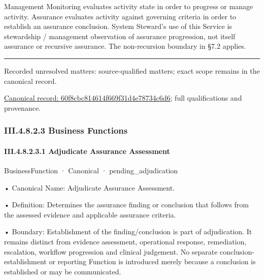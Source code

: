 Management Monitoring evaluates activity state in order to progress or manage activity. Assurance evaluates activity against governing criteria in order to establish an assurance conclusion. System Steward's use of this Service is stewardship / management observation of assurance progression, not itself assurance or recursive assurance. The non-recursion boundary in §7.2 applies.



\medskip\hrule\medskip

{\small Recorded unresolved matters: source-qualified matters; exact scope remains in the canonical record.}\par
{\footnotesize \href{../../../../../../../continuum/business/business-service/60f8cbc814614f669f31d4e78734c6d6.md}{Canonical record: 60f8cbc814614f669f31d4e78734c6d6}; full qualifications and provenance.}\par
\subsubsection*{III.4.8.2.3 Business Functions}
\label{navigation:III.4.8.2.3}

\paragraph*{III.4.8.2.3.1 Adjudicate Assurance Assessment}
\label{navigation:III.4.8.2.3.1}

\label{element:7d7cd216415d4b839ea3edfbf1538110}
{\small BusinessFunction · Canonical · pending\_adjudication}\par

•
Canonical Name: Adjudicate Assurance Assessment.



•
Definition: Determines the assurance finding or conclusion that follows from the assessed evidence and applicable assurance criteria.



•
Boundary: Establishment of the finding/conclusion is part of adjudication. It remains distinct from evidence assessment, operational response, remediation, escalation, workflow progression and clinical judgement. No separate conclusion-establishment or reporting Function is introduced merely because a conclusion is established or may be communicated.



